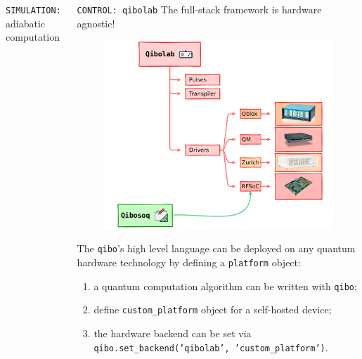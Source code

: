 \documentclass[20pt, final]{beamer}
\newlength{\sepwidth}
\newlength{\colwidth}
\newcommand{\separatorcolumn}{\begin{column}{\sepwidth}\end{column}}
\begin{document}
\begin{frame}[t]
\begin{columns}[t]
\begin{column}{\colwidth}
\begin{block}{\texttt{SIMULATION:} adiabatic computation}
  \end{block}
  \end{column}



  \begin{column}{\colwidth}


  \begin{block}{\texttt{CONTROL: qibolab}}
  The full-stack framework is hardware agnostic!
  \begin{figure}
    \includegraphics[width=0.662  \textwidth]{figures/qibolab_instruments.pdf}
  \end{figure}

  The \texttt{qibo}'s high level language can be deployed on any quantum hardware
  technology by defining a \texttt{platform} object:
  \begin{enumerate}
  \item a quantum computation algorithm can be written with \texttt{qibo};
  \item define \texttt{custom\_platform} object for a self-hosted device;
  \item the hardware backend can be set via \texttt{qibo.set\_backend('qibolab', 'custom\_platform')}.
  \end{enumerate}
  \end{block}


  \separatorcolumn





\end{column}
\end{columns}
\end{frame}
\end{document}
